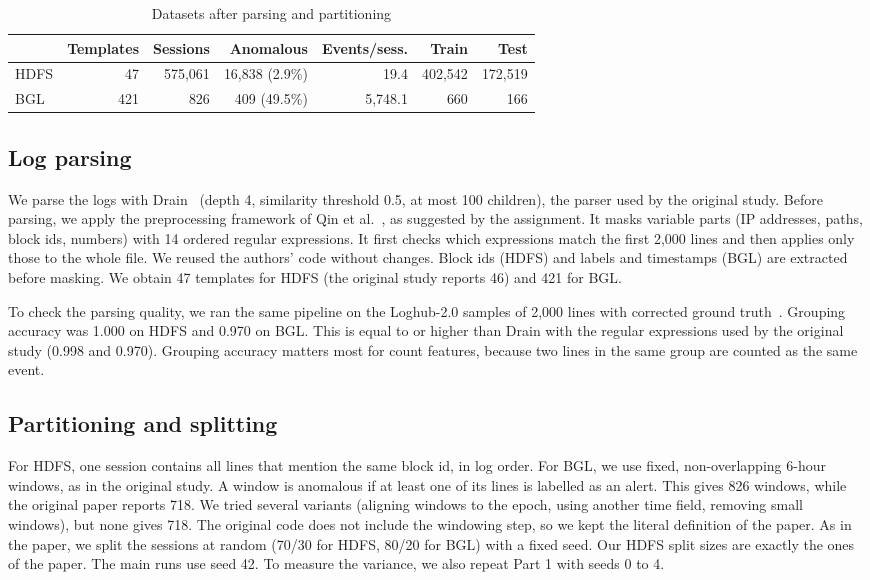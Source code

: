 \documentclass[10pt, conference]{IEEEtran}
\begin{document}
\begin{table}[t]
\centering
\caption{Datasets after parsing and partitioning}
\label{tab:data}
\footnotesize
\setlength{\tabcolsep}{2.2pt}
\begin{tabular}{lrrrrrr}
\toprule
 & Templates & Sessions & Anomalous & Events/sess. & Train & Test \\
\midrule
HDFS & 47 & 575,061 & 16,838 (2.9\%) & 19.4 & 402,542 & 172,519 \\
BGL & 421 & 826 & 409 (49.5\%) & 5,748.1 & 660 & 166 \\
\bottomrule
\end{tabular}
\end{table}

\subsection{Log parsing}

We parse the logs with Drain~\cite{he2017drain} (depth 4, similarity threshold 0.5, at most 100 children), the parser used by the original study. Before parsing, we apply the preprocessing framework of Qin et al.~\cite{qin2025preprocessing}, as suggested by the assignment. It masks variable parts (IP addresses, paths, block ids, numbers) with 14 ordered regular expressions. It first checks which expressions match the first 2,000 lines and then applies only those to the whole file. We reused the authors' code without changes. Block ids (HDFS) and labels and timestamps (BGL) are extracted before masking. We obtain 47 templates for HDFS (the original study reports 46) and 421 for BGL.

To check the parsing quality, we ran the same pipeline on the Loghub-2.0 samples of 2,000 lines with corrected ground truth~\cite{jiang2024loghub2}. Grouping accuracy was 1.000 on HDFS and 0.970 on BGL. This is equal to or higher than Drain with the regular expressions used by the original study (0.998 and 0.970). Grouping accuracy matters most for count features, because two lines in the same group are counted as the same event.

\subsection{Partitioning and splitting}

For HDFS, one session contains all lines that mention the same block id, in log order. For BGL, we use fixed, non-overlapping 6-hour windows, as in the original study. A window is anomalous if at least one of its lines is labelled as an alert. This gives 826 windows, while the original paper reports 718. We tried several variants (aligning windows to the epoch, using another time field, removing small windows), but none gives 718. The original code does not include the windowing step, so we kept the literal definition of the paper. As in the paper, we split the sessions at random (70/30 for HDFS, 80/20 for BGL) with a fixed seed. Our HDFS split sizes are exactly the ones of the paper. The main runs use seed 42. To measure the variance, we also repeat Part 1 with seeds 0 to 4.
\end{document}
